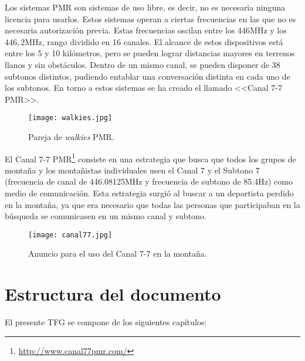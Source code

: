 Los sistemas \ac{PMR} son sistemas de uso libre, es decir, no es necesaria ninguna licencia para usarlos. Estos sistemas operan a ciertas frecuencias en las que no es necesaria autorización previa. Estas frecuencias oscilan entre los 446MHz y los $446,2$MHz, rango dividido en 16 canales. El alcance de estos dispositivos está entre los 5 y 10 kilómetros, pero se pueden lograr distancias mayores en terrenos llanos y sin obstáculos. Dentro de un mismo canal, se pueden disponer de 38 subtonos distintos, pudiendo entablar una conversación distinta en cada uno de los subtonos. En torno a estos sistemas se ha creado el llamado <<Canal 7-7 \ac{PMR}>>.

\begin{figure}[!h]
\begin{center}
\texttt{[image: walkies.jpg]}
\caption{Pareja de \textit{walkies} \ac{PMR}. \protect\footnotemark}
\label{fig:walkies}
\end{center}
\end{figure}

El Canal 7-7 \ac{PMR}\footnote{\url{http://www.canal77pmr.com/}} consiste en una estrategia que busca que todos los grupos de montaña y los montañistas individuales usen el Canal 7 y el Subtono 7 (frecuencia de canal de 446.08125MHz y frecuencia de subtono de 85.4Hz) como medio de comunicación. Esta estrategia surgió al buscar a un deportista perdido en la montaña, ya que era necesario que todas las personas que participaban en la búsqueda se comunicasen en un mismo canal y subtono.

\begin{figure}[!h]
\begin{center}
\texttt{[image: canal77.jpg]}
\caption{Anuncio para el uso del Canal 7-7 en la montaña. \protect\footnotemark}
\label{fig:canal77}
\end{center}
\end{figure}

\section{Estructura del documento}

El presente \ac{TFG} se compone de los siguientes capítulos:

